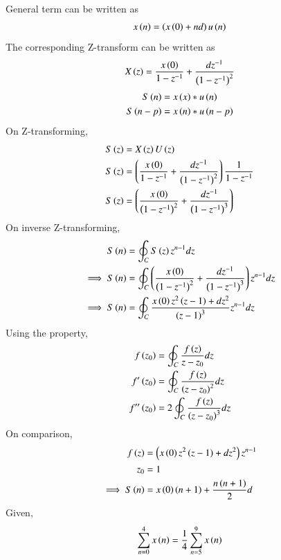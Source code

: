 \documentclass[journal,12pt,twocolumn]{IEEEtran}
\theoremstyle{remark}
\begin{document}
General term can be written as
\begin{align}
    x\left(n\right) = \left(x\left(0\right) + nd\right)u\left(n\right)
\end{align}
The corresponding Z-transform can be written as 
\begin{align}
    X\left(z\right) = \frac{x\left(0\right)}{1 - z^{-1}} + \frac{dz^{-1}}{\left(1 - z^{-1}\right)^{2}} \label{eq2}
\end{align}
    \begin{align}
        S\left(n\right) &= x\left(x\right) * u\left(n\right)\\
        S\left(n-p\right) &= x\left(n\right) * u\left(n-p\right)
    \end{align}
On Z-transforming,
    \begin{align}
        S\left(z\right) &= X\left(z\right)U\left(z\right)\\
        S\left(z\right) &= \left(\frac{x\left(0\right)}{1 - z^{-1}} + \frac{dz^{-1}}{\left(1 - z^{-1}\right)^{2}}\right)\frac{1}{1-z^{-1}}\\
        S\left(z\right) &= \left(\frac{x\left(0\right)}{\left(1 - z^{-1}\right)^2} + \frac{dz^{-1}}{\left(1 - z^{-1}\right)^{3}}\right)
    \end{align}
On inverse Z-transforming, 
    \begin{align}
        S\left(n\right) &= \oint_{C} S\left(z\right)z^{n-1}dz\\
        \implies S\left(n\right) &= \oint_{C} \left(\frac{x\left(0\right)}{\left(1 - z^{-1}\right)^2} + \frac{dz^{-1}}{\left(1 - z^{-1}\right)^{3}}\right) z^{n-1} dz\\
        \implies S\left(n\right) &= \oint_{C} \frac{x\left(0\right)z^{2}\left(z-1\right)+dz^{2}}{\left(z-1\right)^{3}}z^{n-1}dz
    \end{align}
Using the property, 
    \begin{align}
        f\left(z_0\right) &= \oint_{C} \frac{f\left(z\right)}{z-z_0}dz\\
        f'\left(z_0\right) &= \oint_{C} \frac{f\left(z\right)}{\left(z-z_0\right)^{2}}dz\\
        f''\left(z_0\right) &= 2\oint_{C} \frac{f\left(z\right)}{\left(z-z_0\right)^{3}}dz
    \end{align}
On comparison, 
    \begin{align}
        f\left(z\right) &= \left(x\left(0\right)z^2\left(z-1\right)+dz^2\right)z^{n-1}\\
        z_0 &= 1\\
        \implies S\left(n\right) &= x\left(0\right)\left(n+1\right) + \frac{n\left(n+1\right)}{2}d
    \end{align}
Given, 
   \begin{align}
       \sum_{n=0}^{4}x\left(n\right) = \frac{1}{4}\sum_{n=5}^{9}x\left(n\right)
   \end{align}
\end{document}
